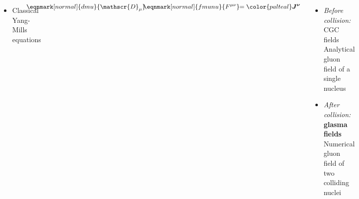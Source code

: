 \documentclass[aspectratio=169,11pt,usenames,dvipsnames]{beamer}
\begin{document}
\begin{frame}
\begin{columns}[onlytextwidth,t]
            \begin{itemize}\itemsep0em 
                \item Classical Yang-Mills equations
            \end{itemize}
            \vspace{20pt}
            \renewcommand{\eqnhighlightheight}{\vphantom{\mathcal{D}_\mu}\mathstrut}\begin{equation*}
                \hspace{-40pt}\eqnmark[normal]{dmu}{\mathscr{D}_\mu}\hspace{-3pt}\eqnmark[normal]{fmunu}{F^{\mu\nu}}\hspace{-3pt}={\color{palteal}\boldsymbol{J^\nu}}
                \end{equation*}
            \vspace{5pt}
            {\footnotesize
            \begin{itemize}\itemsep0em 
                \item \textit{Before collision:} CGC fields\\[1pt] 
                {\color{lightgray} Analytical gluon field of a single nucleus}
                \item \textit{After collision:} {\color{palgold}\bfseries glasma fields}\\[1pt] 
                {\color{lightgray} Numerical gluon field of two colliding nuclei}

\end{itemize}}
\end{columns}
\end{frame}
\end{document}
